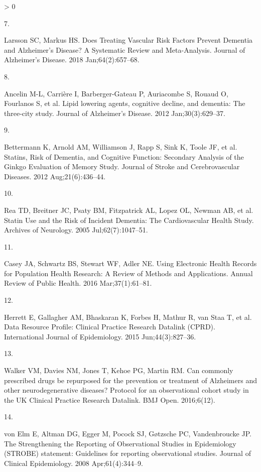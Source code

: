 \documentclass[
]{article}
\newlength{\cslhangindent}
\newlength{\csllabelwidth}
\newenvironment{CSLReferences}[2] %
 {%
  \setlength{\parindent}{0pt}
  \ifodd #1 \everypar{\setlength{\hangindent}{\cslhangindent}}\ignorespaces\fi
  \ifnum #2 > 0
  \setlength{\parskip}{#2\baselineskip}
  \fi
 }%
 {}
\newcommand{\CSLLeftMargin}[1]{\parbox[t]{\csllabelwidth}{#1}}
\newcommand{\CSLRightInline}[1]{\parbox[t]{\linewidth - \csllabelwidth}{#1}\break}
\begin{document}
\begin{CSLReferences}{0}{0}
\leavevmode\hypertarget{ref-larsson2018}{}%
\CSLLeftMargin{7. }
\CSLRightInline{Larsson SC, Markus HS. Does {Treating Vascular Risk Factors Prevent Dementia} and {Alzheimer}'s {Disease}? {A Systematic Review} and {Meta}-{Analysis}. Journal of Alzheimer's Disease. 2018 Jan;64(2):657--68. }

\leavevmode\hypertarget{ref-ancelin2012}{}%
\CSLLeftMargin{8. }
\CSLRightInline{Ancelin M-L, Carrière I, Barberger-Gateau P, Auriacombe S, Rouaud O, Fourlanos S, et al. Lipid lowering agents, cognitive decline, and dementia: The three-city study. Journal of Alzheimer's Disease. 2012 Jan;30(3):629--37. }

\leavevmode\hypertarget{ref-bettermann2012}{}%
\CSLLeftMargin{9. }
\CSLRightInline{Bettermann K, Arnold AM, Williamson J, Rapp S, Sink K, Toole JF, et al. Statins, {Risk} of {Dementia}, and {Cognitive Function}: {Secondary Analysis} of the {Ginkgo Evaluation} of {Memory Study}. Journal of Stroke and Cerebrovascular Diseases. 2012 Aug;21(6):436--44. }

\leavevmode\hypertarget{ref-rea2005}{}%
\CSLLeftMargin{10. }
\CSLRightInline{Rea TD, Breitner JC, Psaty BM, Fitzpatrick AL, Lopez OL, Newman AB, et al. Statin {Use} and the {Risk} of {Incident Dementia}: {The Cardiovascular Health Study}. Archives of Neurology. 2005 Jul;62(7):1047--51. }

\leavevmode\hypertarget{ref-casey2016}{}%
\CSLLeftMargin{11. }
\CSLRightInline{Casey JA, Schwartz BS, Stewart WF, Adler NE. Using {Electronic Health Records} for {Population Health Research}: {A Review} of {Methods} and {Applications}. Annual Review of Public Health. 2016 Mar;37(1):61--81. }

\leavevmode\hypertarget{ref-herrett2015}{}%
\CSLLeftMargin{12. }
\CSLRightInline{Herrett E, Gallagher AM, Bhaskaran K, Forbes H, Mathur R, van Staa T, et al. Data {Resource Profile}: {Clinical Practice Research Datalink} ({CPRD}). International Journal of Epidemiology. 2015 Jun;44(3):827--36. }

\leavevmode\hypertarget{ref-walker2016a}{}%
\CSLLeftMargin{13. }
\CSLRightInline{Walker VM, Davies NM, Jones T, Kehoe PG, Martin RM. Can commonly prescribed drugs be repurposed for the prevention or treatment of {Alzheimers} and other neurodegenerative diseases? {Protocol} for an observational cohort study in the {UK Clinical Practice Research Datalink}. BMJ Open. 2016;6(12). }

\leavevmode\hypertarget{ref-vonelm2008}{}%
\CSLLeftMargin{14. }
\CSLRightInline{von Elm E, Altman DG, Egger M, Pocock SJ, Gøtzsche PC, Vandenbroucke JP. The {Strengthening} the {Reporting} of {Observational Studies} in {Epidemiology} ({STROBE}) statement: Guidelines for reporting observational studies. Journal of Clinical Epidemiology. 2008 Apr;61(4):344--9. }


\end{CSLReferences}
\end{document}
